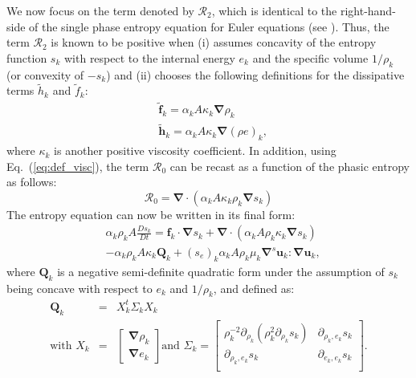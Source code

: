 \documentclass[preprint,10pt]{elsarticle}
\renewcommand{\div}{\mbold{\nabla}\! \cdot \!}
\newcommand{\grad}{\mbold{\nabla}}
\newcommand{\mbold}[1]{\boldsymbol#1}
\newcommand{\eqt}[1]{Eq.~(\ref{#1})}                     %
\begin{document}
We now focus on the term denoted by $\mathcal{R}_2$, which is identical to the right-hand-side of the single phase entropy equation for Euler equations (see \cite{jlg, Marco_paper_low_mach}). Thus, the term $\mathcal{R}_2$ is known to be positive when (i) assumes concavity of the entropy function $s_k$ with respect to the internal energy $e_k$ and the specific volume $1 / \rho_k$ (or convexity of $-s_k$) and (ii) chooses the following definitions for the dissipative terms $\tilde{h}_k$ and $\tilde{f}_k$:
%
\begin{subequations}
\begin{align}\label{eq:def_visc}
&\tilde{\mbold f}_k = \alpha_k A \kappa_k \grad \rho_k \\
&\tilde{\mbold h}_k = \alpha_k A \kappa_k \grad \left( \rho e \right)_k,
\end{align}
\end{subequations}
%  
where $\kappa_k$ is another positive viscosity coefficient. In addition, using \eqt{eq:def_visc}, the term $\mathcal{R}_0$ can be recast as a function of the phasic entropy as follows: 
%
\begin{equation}
\mathcal{R}_0 = \div \left( \alpha_k A \kappa_k \rho_k \grad s_k \right)
\end{equation}
%
The entropy equation can now be written in its final form:
%
\begin{align}\label{eq:ent-res-7-eqn-diss-terms3}
&\alpha_k \rho_k A \frac{Ds_k}{Dt} =  \mbold f_k \cdot \grad s_k + \div \left( \alpha_k A \rho_k \kappa_k  \grad s_k \right)  \nonumber\\
&- \alpha_k \rho_k A \kappa_k \mathbf{Q}_k + (s_e)_k \alpha_k A \rho_k \mu_k \grad^s \mbold u_k : \grad \mbold u_k,
\end{align}
%
where $\mathbf{Q}_k$ is a negative semi-definite quadratic form under the assumption of $s_k$ being concave with respect to $e_k$ and $1/ \rho_k$, and defined as:
%
\begin{eqnarray}
\mathbf{Q}_k &=& X^t_k \Sigma_k X_k \nonumber \\
\text{with } X_k &=& \begin{bmatrix}
\grad \rho_k \\
\grad e_k 
\end{bmatrix}
\text{and } \Sigma_k = \begin{bmatrix}
       \rho_k^{-2} \partial_{\rho_k} (\rho^2_k \partial_{\rho_k} s_k) & \partial_{\rho_k,e_k} s_k  \\[0.3em]
       \partial_{\rho_k,e_k} s_k & \partial_{e_k,e_k} s_k           \\[0.3em]
     \end{bmatrix}. \nonumber 
\end{eqnarray}
\end{document}
